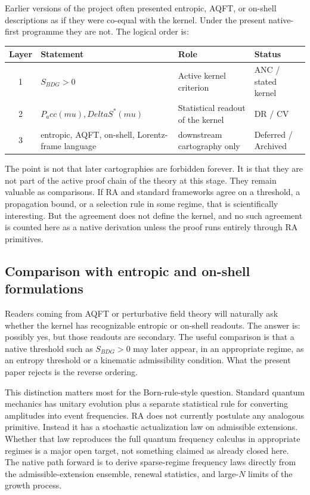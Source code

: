 \documentclass[11pt]{article}
\def\Delta{Delta}%
\def\mu{mu}%
\def\mathrm#1{#1}%
\def\Pacc{P_acc}%
\newcommand{\Pacc}{P_{\mathrm{acc}}}
\begin{document}
Earlier versions of the project often presented entropic, AQFT, or on-shell descriptions as if they were co-equal with the kernel. Under the present native-first programme they are not. The logical order is:
\begin{center}
\begin{tabular}{clll}
\toprule
Layer & Statement & Role & Status \\
\midrule
1 & $S_{\mathrm{BDG}} > 0$ & Active kernel criterion & ANC / stated kernel \\
2 & $\Pacc(\mu), \Delta S^*(\mu)$ & Statistical readout of the kernel & DR / CV \\
3 & entropic, AQFT, on-shell, Lorentz-frame language & downstream cartography only & Deferred / Archived \\
\bottomrule
\end{tabular}
\end{center}

The point is not that later cartographies are forbidden forever. It is that they are not part of the active proof chain of the theory at this stage. They remain valuable as comparisons. If RA and standard frameworks agree on a threshold, a propagation bound, or a selection rule in some regime, that is scientifically interesting. But the agreement does not define the kernel, and no such agreement is counted here as a native derivation unless the proof runs entirely through RA primitives.

\subsection{Comparison with entropic and on-shell formulations}

Readers coming from AQFT or perturbative field theory will naturally ask whether the kernel has recognizable entropic or on-shell readouts. The answer is: possibly yes, but those readouts are secondary. The useful comparison is that a native threshold such as $S_{\mathrm{BDG}}>0$ may later appear, in an appropriate regime, as an entropy threshold or a kinematic admissibility condition. What the present paper rejects is the reverse ordering.

This distinction matters most for the Born-rule-style question. Standard quantum mechanics has unitary evolution plus a separate statistical rule for converting amplitudes into event frequencies. RA does not currently postulate any analogous primitive. Instead it has a stochastic actualization law on admissible extensions. Whether that law reproduces the full quantum frequency calculus in appropriate regimes is a major open target, not something claimed as already closed here. The native path forward is to derive sparse-regime frequency laws directly from the admissible-extension ensemble, renewal statistics, and large-$N$ limits of the growth process.
\end{document}
